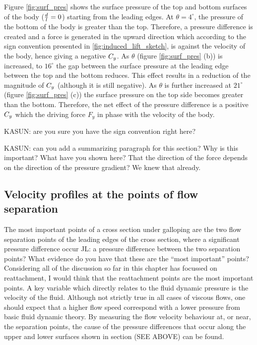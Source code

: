 Figure \ref{fig:surf_pres} shows the surface pressure of the top and bottom surfaces of the body ($\frac{d}{l}=0$) starting from  the leading edges. At $\theta=4^{\circ}$, the pressure of the bottom of the body is greater than the top. Therefore, a pressure difference is created and a force is generated in the upward direction which according to the sign convention presented in \ref{fig:induced_lift_sketch}, is against the velocity of the body, hence giving a negative $C_{y}$. As $\theta$ (figure \ref{fig:surf_pres} (b)) is increased, to $16^{\circ}$ the gap between the surface pressure at the leading edge between the top and the bottom reduces. This effect results in a reduction of the magnitude of $C_{y}$ (although it is still negative). As $\theta$ is further increased at $21^{\circ}$ (figure \ref{fig:surf_pres} (c)) the surface pressure on the top side becomes greater than the bottom. Therefore, the net effect of the pressure difference is a positive $C_{y}$ which the driving force $F_y$ in phase with the velocity of the body.

KASUN: are you sure you have the sign convention right here?

KASUN: can you add a summarizing paragraph for this section? Why is this important? What have you shown here? That the direction of the force depends on the direction of the pressure gradient? We knew that already.

\subsection{Velocity profiles at the points of flow separation}

The most important points of a cross section under galloping are the two flow separation points of the leading edges of the cross section, where a significant pressure difference occur JL: a pressure difference between the two separation points? What evidence do you have that these are the ``most important'' points? Considering all of the discussion so far in this chapter has focussed on reattachment, I would think that the reattachment points are the most important points. A key variable which directly relates to the fluid dynamic pressure is the velocity of the fluid. Although not strictly true in all cases of viscous flows, one should expect that a higher flow speed correspond with a lower pressure from basic fluid dynamic theory. By measuring the flow velocity behaviour at, or near, the separation points, the cause of the pressure differences that occur along the upper and lower surfaces shown in section (SEE ABOVE) can be found.

